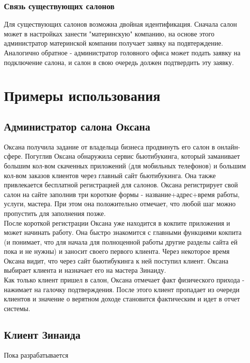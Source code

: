 \documentclass[DIV=calc, paper=a4, fontsize=11pt]{scrartcl} %
\begin{document}
\subsubsection{Связь существующих салонов}
Для существующих салонов возможна двойная идентификация. Сначала салон может в настройках занести "материнскую" компанию, на основе этого администратор материнской компании получает заявку на подвтерждение. Аналогично обратное - администратор головного офиса может подать заявку на подключение салона, и салон в свою очередь должен подтвердить эту заявку.


\section{Примеры использования}



\begin{framed}
    \subsection{Администратор салона Оксана}
    Оксана получила задание от владельца бизнеса продвинуть его салон в онлайн-сфере. Погуглив Оксана обнаружила сервис бьютибукинга, который заманивает большим кол-вом скаченных приложений (для мобильных телефонов) и большим кол-вом заказов клиентов через главный сайт бьютибукинга. Она также привлекается бесплатной регистрацией для салонов. Оксана регистрирует свой салон на сайте заполнив три короткие формы - название+адрес+время работы, услуги, мастера. При этом она положительно отмечает, что любой шаг можно пропустить для заполнения позже. 
    \\[0.5cm]
    После короткой регистрации Оксана уже находится в кокпите приложения и может начинать работу. Она быстро знакомится с главными функциями кокпита (и понимает, что для начала для полноценной работы другие разделы сайта ей пока и не нужны) и заносит своего первого клиента. Через некоторое время Оксана видит, что через сайт бьютибукинга к ней поступил клиент. Оксана выбирает клиента и назначает его на мастера Зинаиду. 
    \\[0.5cm]
    Как только клиент пришел в салон, Оксана отмечает факт физического прихода - нажимает на галочку подтверждения. После этого клиент пропадает из очереди клиентов и значение о верятном доходе становится фактическим и идет в отчет системы.
    
\end{framed}

\begin{framed}
    \subsection{Клиент Зинаида}
    Пока разрабатывается
\end{framed}
\end{document}

